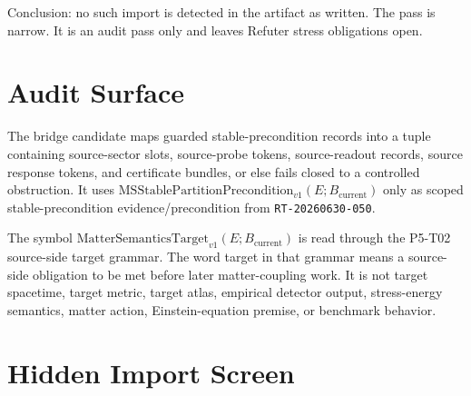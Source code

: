\documentclass[11pt]{article}
\newcommand{\Bcur}{B_{\mathrm{current}}}
\newcommand{\MSStablePre}{\mathrm{MSStablePartitionPrecondition}_{v1}}
\newcommand{\Target}{\mathrm{MatterSemanticsTarget}_{v1}}
\begin{document}
Conclusion: no such import is detected in the artifact as written. The pass
is narrow. It is an audit pass only and leaves Refuter stress obligations open.

\section{Audit Surface}

The bridge candidate maps guarded stable-precondition records into a tuple
containing source-sector slots, source-probe tokens, source-readout records,
source response tokens, and certificate bundles, or else fails closed to a
controlled obstruction. It uses \(\MSStablePre(E;\Bcur)\) only as scoped
stable-precondition evidence/precondition from \texttt{RT-20260630-050}.

The symbol \(\Target(E;\Bcur)\) is read through the P5-T02 source-side target
grammar. The word target in that grammar means a source-side obligation to be
met before later matter-coupling work. It is not target spacetime, target
metric, target atlas, empirical detector output, stress-energy semantics,
matter action, Einstein-equation premise, or benchmark behavior.

\section{Hidden Import Screen}
\end{document}
